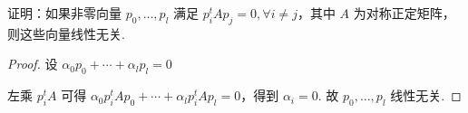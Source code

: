\begin{problem}
    证明：如果非零向量 $p_0, \dots, p_l$ 满足 $p_i^tAp_j = 0, \forall i \neq j$，其中 $A$ 为对称正定矩阵，则这些向量线性无关.

    \begin{proof}
        设 $\alpha_0p_0 + \cdots + \alpha_lp_l = 0$

        左乘 $p_i^tA$ 可得 $\alpha_0p_i^tAp_0 + \cdots + \alpha_lp_i^tAp_l = 0$，得到 $\alpha_i = 0$. 故 $p_0, \dots, p_l$ 线性无关.
    \end{proof}
\end{problem}

